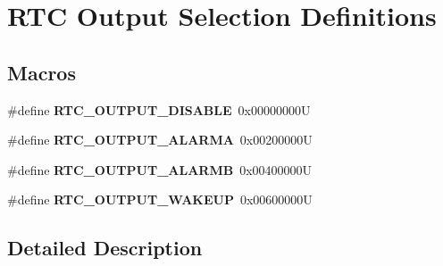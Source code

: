 \hypertarget{group___r_t_c___output__selection___definitions}{}\section{R\+TC Output Selection Definitions}
\label{group___r_t_c___output__selection___definitions}
\subsection*{Macros}
\begin{DoxyCompactItemize}
\item 
\mbox{\label{group___r_t_c___output__selection___definitions_ga2c2347927c96e0db36e16d865a33a5e9}} 
\#define {\bfseries R\+T\+C\+\_\+\+O\+U\+T\+P\+U\+T\+\_\+\+D\+I\+S\+A\+B\+LE}~0x00000000U
\item 
\mbox{\label{group___r_t_c___output__selection___definitions_gab5decd99536cc483960c47de13d2cdf1}} 
\#define {\bfseries R\+T\+C\+\_\+\+O\+U\+T\+P\+U\+T\+\_\+\+A\+L\+A\+R\+MA}~0x00200000U
\item 
\mbox{\label{group___r_t_c___output__selection___definitions_gad0ee3ae5e03aada25ee96ca797d94a9d}} 
\#define {\bfseries R\+T\+C\+\_\+\+O\+U\+T\+P\+U\+T\+\_\+\+A\+L\+A\+R\+MB}~0x00400000U
\item 
\mbox{\label{group___r_t_c___output__selection___definitions_gaa670c4221f0e1d6611bc477bfcb8b124}} 
\#define {\bfseries R\+T\+C\+\_\+\+O\+U\+T\+P\+U\+T\+\_\+\+W\+A\+K\+E\+UP}~0x00600000U
\end{DoxyCompactItemize}


\subsection{Detailed Description}
